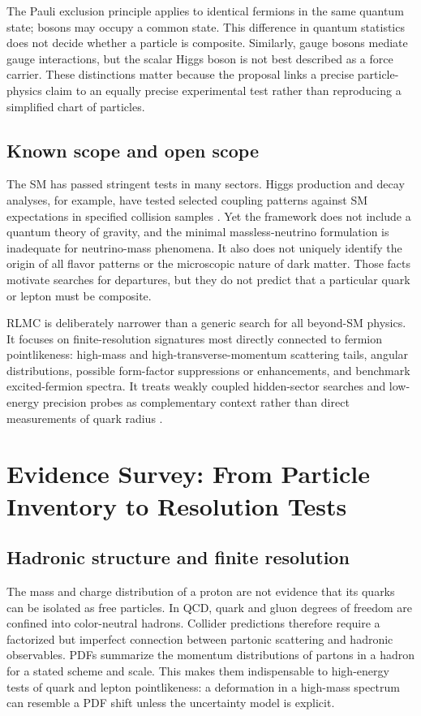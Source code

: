 \documentclass[conference]{../../../../Conference-LaTeX-template_10-17-19/IEEEtran}
\begin{document}
The Pauli exclusion principle applies to identical fermions in the same quantum state; bosons may occupy a common state. This difference in quantum statistics does not decide whether a particle is composite. Similarly, gauge bosons mediate gauge interactions, but the scalar Higgs boson is not best described as a force carrier. These distinctions matter because the proposal links a precise particle-physics claim to an equally precise experimental test rather than reproducing a simplified chart of particles.

\subsection{Known scope and open scope}

The SM has passed stringent tests in many sectors. Higgs production and decay analyses, for example, have tested selected coupling patterns against SM expectations in specified collision samples \cite{cms_higgs2015}. Yet the framework does not include a quantum theory of gravity, and the minimal massless-neutrino formulation is inadequate for neutrino-mass phenomena. It also does not uniquely identify the origin of all flavor patterns or the microscopic nature of dark matter. Those facts motivate searches for departures, but they do not predict that a particular quark or lepton must be composite.

RLMC is deliberately narrower than a generic search for all beyond-SM physics. It focuses on finite-resolution signatures most directly connected to fermion pointlikeness: high-mass and high-transverse-momentum scattering tails, angular distributions, possible form-factor suppressions or enhancements, and benchmark excited-fermion spectra. It treats weakly coupled hidden-sector searches and low-energy precision probes as complementary context rather than direct measurements of quark radius \cite{alekhin2016,jaeckel2010}.

\section{Evidence Survey: From Particle Inventory to Resolution Tests}

\subsection{Hadronic structure and finite resolution}

The mass and charge distribution of a proton are not evidence that its quarks can be isolated as free particles. In QCD, quark and gluon degrees of freedom are confined into color-neutral hadrons. Collider predictions therefore require a factorized but imperfect connection between partonic scattering and hadronic observables. PDFs summarize the momentum distributions of partons in a hadron for a stated scheme and scale. This makes them indispensable to high-energy tests of quark and lepton pointlikeness: a deformation in a high-mass spectrum can resemble a PDF shift unless the uncertainty model is explicit.
\end{document}
